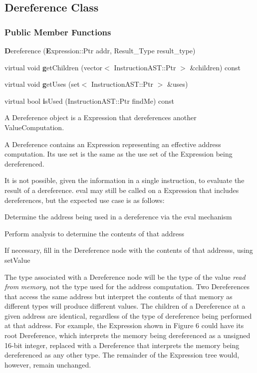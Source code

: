 \subsection{Dereference Class}
\label{classDyninst_1_1InstructionAPI_1_1Dereference}
\subsubsection*{Public Member Functions}
\begin{DoxyCompactItemize}
\item 
{\textbf Dereference} ({\textbf Expression::Ptr} addr, Result\_\-Type result\_\-type)
\item 
virtual void {\textbf getChildren} (vector$<$ InstructionAST::Ptr $>$ \&children) const 
\item 
virtual void {\textbf getUses} (set$<$ InstructionAST::Ptr $>$ \&uses)
\item 
virtual bool {\textbf isUsed} (InstructionAST::Ptr findMe) const 
\end{DoxyCompactItemize}



A Dereference object is a Expression that dereferences another ValueComputation.

A Dereference contains an Expression representing an effective address computation. Its use set is the same as the use set of the Expression being dereferenced.

It is not possible, given the information in a single instruction, to evaluate the result of a dereference. {\ttfamily eval} may still be called on a Expression that includes dereferences, but the expected use case is as follows:
\begin{DoxyItemize}
\item Determine the address being used in a dereference via the {\ttfamily eval} mechanism
\item Perform analysis to determine the contents of that address
\item If necessary, fill in the Dereference node with the contents of that addresss, using {\ttfamily setValue} 
\end{DoxyItemize}

The type associated with a Dereference node will be the type of the value {\itshape read\/} {\itshape from\/} {\itshape memory\/}, not the type used for the address computation. Two Dereferences that access the same address but interpret the contents of that memory as different types will produce different values. The children of a Dereference at a given address are identical, regardless of the type of dereference being performed at that address. For example, the Expression shown in Figure 6 could have its root Dereference, which interprets the memory being dereferenced as a unsigned 16-\/bit integer, replaced with a Dereference that interprets the memory being dereferenced as any other type. The remainder of the Expression tree would, however, remain unchanged. 

